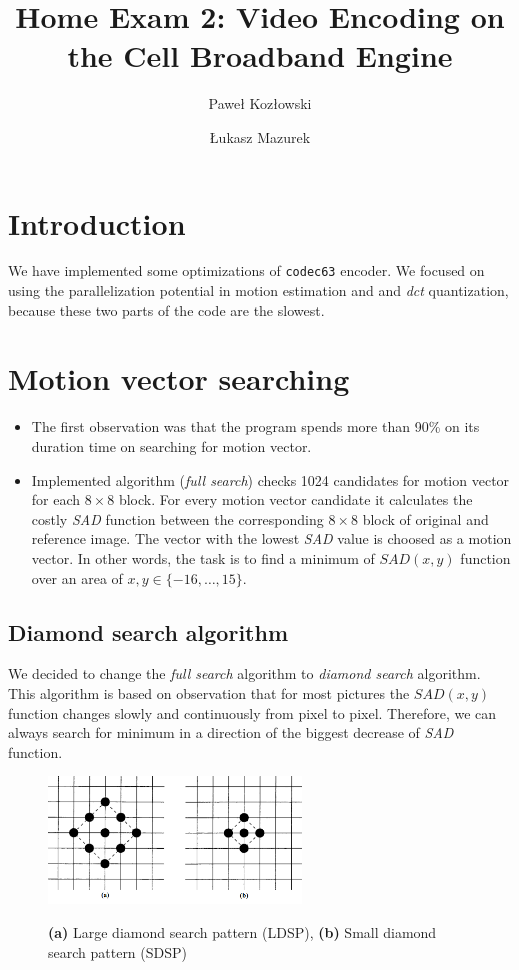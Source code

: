 \documentclass[11pt]{article}
\title{Home Exam 2: Video Encoding on the Cell Broadband Engine}
\author{Paweł Kozłowski \and Łukasz Mazurek}
\begin{document}
\maketitle

\section{Introduction}
We have implemented some optimizations of \texttt{codec63} encoder.
We focused on using the parallelization potential in motion estimation and and \emph{dct} quantization,
because these two parts of the code are the slowest.

\section{Motion vector searching}
\begin{itemize}
\item
The first observation was that the program spends more than 90\% on its
duration time on searching for motion vector.
\item
Implemented algorithm (\emph{full search}) checks 1024 candidates for motion vector for each $8 \times 8$ block.
For every motion vector candidate it calculates the costly \emph{SAD} function
between the corresponding $8 \times 8$ block of original and reference image.
The vector with the lowest \emph{SAD} value is choosed as a motion vector.
In other words, the task is to find a minimum of $SAD(x,y)$ function
over an area of $x,y \in \{-16, \ldots, 15\}$.
\end{itemize}

\subsection{Diamond search algorithm}
We decided to change the \emph{full search} algorithm to \emph{diamond search}\cite{ds} algorithm.
This algorithm is based on observation that for most pictures the 
$SAD(x,y)$ function changes slowly and continuously from pixel to pixel.
Therefore, we can always search for minimum in a direction of the biggest
 decrease of \emph{SAD} function.

\begin{figure}[h]
    \centering
    \includegraphics[width=0.6\textwidth]{bigsmall}
    \label{bigsmall}
    \caption{\textbf{(a)} Large diamond search pattern (LDSP), \textbf{(b)}
    Small diamond search pattern (SDSP)}
\end{figure}
\end{document}
